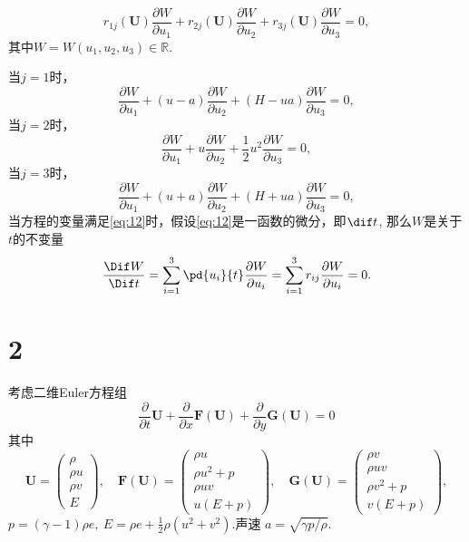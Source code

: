 \documentclass[12pt]{article}
\begin{document}
\begin{equation}
	r_{1 j}(\boldsymbol{U}) \frac{\partial W}{\partial u_{1}}+r_{2 j}(\boldsymbol{U}) \frac{\partial W}{\partial u_{2}}+r_{3 j}(\boldsymbol{U}) \frac{\partial W}{\partial u_{3}}=0,
\end{equation}
其中$W=W\left(u_{1}, u_{2}, u_{3}\right) \in \mathbb{R}$.

当$j=1$时，
\begin{equation}
	\frac{\partial W}{\partial u_{1}}+(u-a)\frac{\partial W}{\partial u_{2}}+(H-ua)\frac{\partial W}{\partial u_{3}}=0,
\end{equation}
当$j=2$时，
\begin{equation}
	 \frac{\partial W}{\partial u_{1}}+u \frac{\partial W}{\partial u_{2}}+\frac{1}{2}u^2 \frac{\partial W}{\partial u_{3}}=0,
\end{equation}
当$j=3$时，
\begin{equation}
	 \frac{\partial W}{\partial u_{1}}+(u+a) \frac{\partial W}{\partial u_{2}}+(H+ua) \frac{\partial W}{\partial u_{3}}=0,
\end{equation}
当方程的变量满足\cref{eq:12}时，假设\cref{eq:12}是一函数的微分，即$\dif t$, 那么$W$是关于$t$的不变量
\begin{equation}
	\frac{\Dif W}{\Dif t} = \sum^3_{i=1} \pd{u_i}{t} \frac{\partial W}{\partial u_{i}} = \sum^3_{i=1} r_{i j} \frac{\partial W}{\partial u_{i}}=0.
\end{equation}

\section{2}

考虑二维Euler方程组
\begin{equation}
	\frac{\partial}{\partial t} \boldsymbol{U}+\frac{\partial}{\partial x} \boldsymbol{F}(\boldsymbol{U})+\frac{\partial}{\partial y} \boldsymbol{G}(\boldsymbol{U})=0
\end{equation}
其中
\begin{equation}
	\boldsymbol{U}=\left(\begin{array}{c}
		\rho \\
		\rho u \\
		\rho v \\
		E
		\end{array}\right), \quad \boldsymbol{F}(\boldsymbol{U})=\left(\begin{array}{c}
		\rho u \\
		\rho u^{2}+p \\
		\rho u v \\
		u(E+p)
		\end{array}\right), \quad \boldsymbol{G}(\boldsymbol{U})=\left(\begin{array}{c}
		\rho v \\
		\rho u v \\
		\rho v^{2}+p \\
		v(E+p)
		\end{array}\right),
\end{equation}
$p=(\gamma-1) \rho e,\ E=\rho e+\frac{1}{2} \rho\left(u^{2}+v^{2}\right)$.声速 $a=\sqrt{\gamma p / \rho} .$
\end{document}
